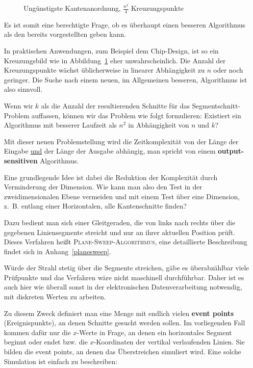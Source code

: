 \documentclass{scrreprt}%
\theoremstyle{break}
\begin{document}
\begin{figure}
  \begin{center}\end{center}
  \caption{Ungünstigste Kantenanordnung, $\frac{n^2}{4}$ Kreuzungspunkte}
  \label{131003c}
\end{figure}

Es ist somit eine berechtigte Frage, ob es überhaupt einen besseren
Algorithmus als den bereits vorgestellten geben kann.

In praktischen Anwendungen, zum Beispiel dem Chip-Design, ist so ein
Kreuzungsbild wie in Abbildung~\ref{131003c} eher unwahrscheinlich. Die
Anzahl der Kreuzungspunkte wächst üblicherweise in linearer
Abhängigkeit zu $n$ oder noch geringer. Die Suche nach einem neuen, im
Allgemeinen besseren, Algorithmus ist also sinnvoll.

Wenn wir $k$ als die Anzahl der resultierenden Schnitte für das
Segmentschnitt-Problem auffassen, können wir das Problem wie folgt
formulieren: Existiert ein Algorithmus mit besserer Laufzeit als $n^2$ in 
Abhängigkeit von $n$ und $k$?

Mit dieser neuen Problemstellung wird die Zeitkomplexität von der Länge
der Eingabe \underline{und} der Länge der Ausgabe abhängig, man spricht
von einem \textbf{output-sensitiven} Algorithmus.

Eine grundlegende Idee ist dabei die Reduktion der Komplexität durch
Verminderung der Dimension. Wie kann man also den Test in der
zweidimensionalen Ebene vermeiden und mit einem Test über eine
Dimension, z.~B. entlang einer Horizontalen, alle Kantenschnitte
finden?

Dazu bedient man sich einer Gleitgeraden, die von links nach rechts
über die gegebenen Liniensegmente streicht und nur an ihrer aktuellen
Position prüft. Dieses Verfahren heißt \textsc{Plane-Sweep-Algorithmus},
eine detaillierte Beschreibung findet sich in Anhang~\ref{planesweep}.

Würde der Strahl stetig über die Segmente streichen, gäbe es
überabzählbar viele Prüfpunkte und das Verfahren wäre nicht maschinell
durchführbar. Daher ist es auch hier wie überall sonst in der
elektronischen Datenverarbeitung notwendig, mit diskreten Werten zu
arbeiten.
 
Zu diesem Zweck definiert man eine Menge mit endlich vielen \textbf{event
points} (Ereignispunkte), an denen Schnitte gesucht werden sollen. Im
vorliegenden Fall kommen dafür nur die $x$-Werte in Frage, an denen ein
horizontales Segment beginnt oder endet bzw. die $x$-Koordinaten der
vertikal verlaufenden Linien. Sie bilden die event points, an denen das
Überstreichen simuliert wird. Eine solche Simulation ist einfach zu
beschreiben:
\end{document}

